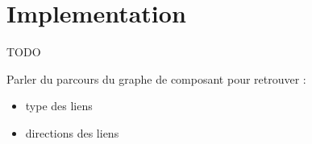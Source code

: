 \chapter{Implementation} %
\label{cha:Implementation}

TODO

Parler du parcours du graphe de composant pour retrouver :
\begin{itemize}
    \item type des liens
    \item directions des liens
\end{itemize}



